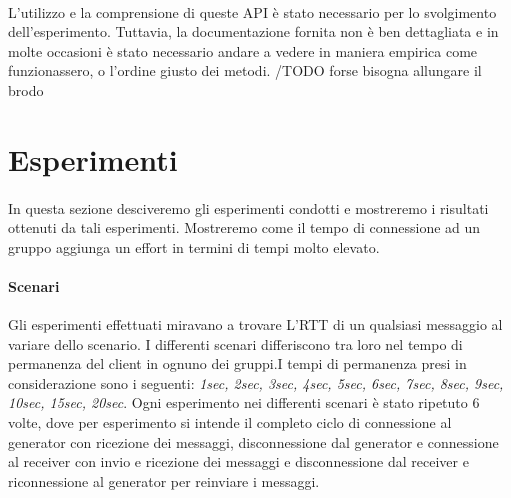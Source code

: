 \documentclass{llncs}
\begin{document}
\paragraph{} L'utilizzo e la comprensione di queste API è stato necessario per lo svolgimento dell'esperimento. Tuttavia, la documentazione fornita non è ben dettagliata e in molte occasioni è stato necessario andare a vedere in maniera empirica come funzionassero, o l'ordine giusto dei metodi.
/TODO forse bisogna allungare il brodo


\section{Esperimenti}
\paragraph{} In questa sezione desciveremo gli esperimenti condotti e mostreremo i risultati ottenuti da tali esperimenti. Mostreremo come il tempo di connessione ad un gruppo aggiunga un effort in termini di tempi molto elevato.
\paragraph{Scenari} Gli esperimenti effettuati miravano a trovare L'RTT di un qualsiasi messaggio al variare dello scenario. I differenti scenari differiscono tra loro nel tempo di permanenza del client in ognuno dei gruppi.I tempi di permanenza presi in considerazione sono i seguenti: \textit{1sec, 2sec, 3sec, 4sec, 5sec, 6sec, 7sec, 8sec, 9sec, 10sec, 15sec, 20sec}. Ogni esperimento nei differenti scenari è stato ripetuto 6 volte, dove per esperimento si intende il completo ciclo di connessione al generator con ricezione dei messaggi, disconnessione dal generator e connessione al receiver con invio e ricezione dei messaggi e disconnessione dal receiver e riconnessione al generator per reinviare i messaggi.
\end{document}
